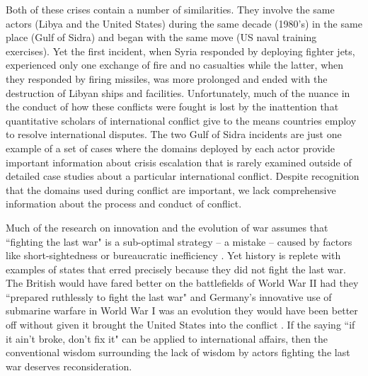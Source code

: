 \documentclass[12pt,letterpaper]{article}
\begin{document}
	Both of these crises contain a number of similarities. They involve the same actors (Libya and the United States) during the same decade (1980's) in the same place (Gulf of Sidra) and began with the same move (US naval training exercises). Yet the first incident, when Syria responded by deploying fighter jets, experienced only one exchange of fire and no casualties while the latter, when they responded by firing missiles, was more prolonged and ended with the destruction of Libyan ships and facilities. Unfortunately, much of the nuance in the conduct of how these conflicts were fought is lost by the inattention that quantitative scholars of international conflict give to the means countries employ to resolve international disputes. The two Gulf of Sidra incidents are just one example of a set of cases where the domains deployed by each actor provide important information about crisis escalation that is rarely examined outside of detailed case studies about a particular international conflict. Despite recognition that the domains used during conflict are important, we lack comprehensive information about the process and conduct of conflict.
	
	Much of the research on innovation and the evolution of war assumes that ``fighting the last war" is a sub-optimal strategy -- a mistake \citep{howard_causeswarsother_1983} -- caused by factors like short-sightedness or bureaucratic inefficiency \citep{murray_militaryadaptationwar_2009}. Yet history is replete with examples of states that erred precisely because they did not fight the last war. The British would have fared better on the battlefields of World War II had they ``prepared ruthlessly to fight the last war" \citep[88]{millett_lessonswar_1988} and Germany's innovative use of submarine warfare in World War I was an evolution they would have been better off without given it brought the United States into the conflict \citep{hull_absolutedestructionmilitary_2013}. If the saying ``if it ain't broke, don't fix it" can be applied to international affairs, then the conventional wisdom surrounding the lack of wisdom by actors fighting the last war deserves reconsideration.
	
\end{document}
